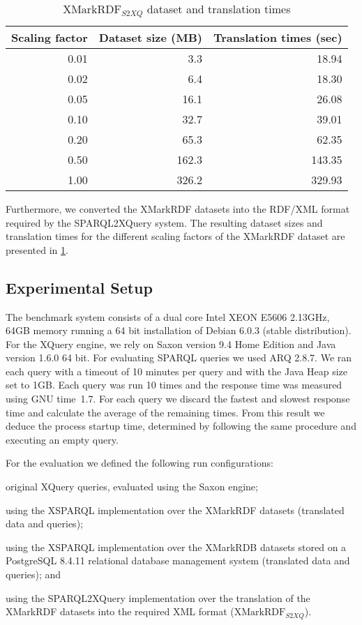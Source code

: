 \begin{table}[t]
\caption{$\textrm{XMarkRDF}_{\mathit{S2XQ}}$ dataset and translation times}
\label{tab:XMarkRDF-groppe}
\centering
\begin{tabular}{rrr}
 \toprule
  Scaling factor & Dataset size (MB) & Translation times (sec)\tabularnewline
 \midrule
  0.01 &   3.3 & 18.94\tabularnewline
  0.02 &   6.4 & 18.30\tabularnewline
  0.05 &  16.1 & 26.08\tabularnewline
  0.10 &  32.7 & 39.01\tabularnewline
  0.20 &  65.3 & 62.35\tabularnewline
  0.50 & 162.3 & 143.35\tabularnewline
  1.00 & 326.2 & 329.93\tabularnewline
 \bottomrule
\end{tabular}
\end{table}


Furthermore, we converted the XMarkRDF datasets into the RDF/XML format required by the SPAR\-QL2\-XQuery system. The
resulting dataset sizes and translation times for the different scaling factors of the XMarkRDF dataset are presented in
\cref{tab:XMarkRDF-groppe}.



\subsection{Experimental Setup}
\label{sec:experimental_setup}



The benchmark system consists of a dual core Intel XEON E5606 2.13GHz, 64GB memory running a 64 bit installation of
Debian 6.0.3 (stable distribution).
%
For the XQuery engine, we rely on Saxon version 9.4 Home Edition and Java version 1.6.0 64 bit. For evaluating SPARQL
queries we used ARQ 2.8.7.  We ran each query with a timeout of 10 minutes per query and with the Java Heap size set to
1GB.  Each query was run 10 times and the response time was measured using GNU time~1.7.  For each query we discard the
fastest and slowest response time and calculate the average of the remaining times.  From this result we deduce the
process startup time, determined by following the same procedure and executing an empty query.


For the evaluation we defined the following run configurations:
\begin{description}[noitemsep]
\item[$\mathit{XQ}$:] original XQuery queries, evaluated using the Saxon engine;
\item[$\mathit{XS^{rdf}}$:] using the XSPARQL implementation over the XMarkRDF datasets (translated data and queries);
\item[$\mathit{XS^{rdb}}$:] using the XSPARQL implementation over the XMarkRDB datasets stored on a PostgreSQL 8.4.11
  relational database management system (translated data and queries); and
\item[$\mathit{S2XQ}$:] using the SPARQL2XQuery implementation over the translation of the XMarkRDF datasets into the
  required \ac{XML} format ($\textrm{XMarkRDF}_{\mathit{S2XQ}}$).
\end{description}


